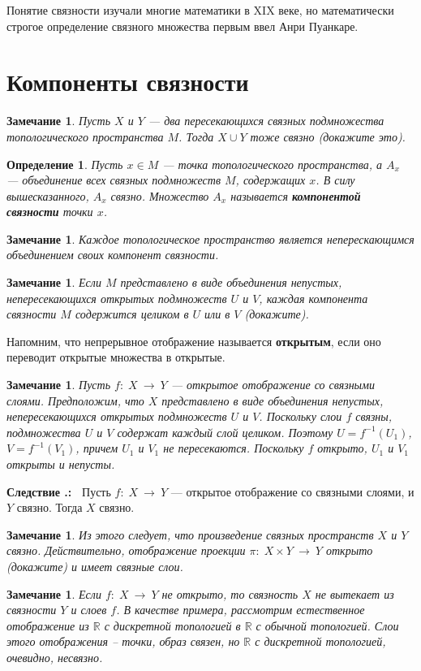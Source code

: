 \documentclass[12pt]{book}
\newcommand{\arrow}{{\:\longrightarrow\:}}
\def\endproof{\hbox{\vrule width 5pt height 5pt depth 0pt}}
\def\R{{\mathbb R}}
\theoremstyle{upshape}
\newtheorem{zadacha}{Задача}[chapter]
\theoremstyle{generic}
\newtheorem{opredelenie}[teorema]{Определение}
\newtheorem{remark}[teorema]{Замечание}
\def\замечание{\begin{remark}}
\def\еза{\end{remark}}
\theoremstyle{upshapenonumber}
\newcommand{\следствие}{%
     \refstepcounter{teorema}
     {\noindent\bf Следствие \thechapter.\arabic{teorema}:\ }}
\newcommand{\пример}{%
     \refstepcounter{teorema}
     {\noindent\bf Пример \thechapter.\arabic{teorema}:\ }}
\newcommand{\лемма}{%
     \refstepcounter{teorema}
     {\noindent\bf Лемма \thechapter.\arabic{teorema}:\ }}
\newcommand{\теорема}{%
     \refstepcounter{teorema}
     {\noindent\bf Теорема \thechapter.\arabic{teorema}:\ }}
\newcommand{\утверждение}{%
     \refstepcounter{teorema}
     {\noindent\bf Утверждение \thechapter.\arabic{teorema}:\ }}
\def\бф{\bf}
\def\ем{\em}
\def\задача{\begin{zadacha}}
\def\ез{\end{zadacha}}
\def\еу{\end{ukazanie}}
\def\определение{\begin{opredelenie}}
\def\ео{\end{opredelenie}}
\def\енум{\begin{enumerate}}
\def\ее{\end{enumerate}}
\begin{document}
\hfill

Понятие связности изучали многие математики в XIX веке, но
математически строгое определение связного множества первым
ввел Анри Пуанкаре.


\section{Компоненты связности}


\замечание
Пусть $X$ и $Y$ --- два пересекающихся связных подмножества
топологического пространства $M$. Тогда $X \cup Y$ тоже связно
(докажите это).
\еза


\определение
Пусть $x\in M$ --- точка топологического пространства,
а $A_x$ --- объединение всех связных подмножеств $M$,
содержащих $x$. В силу вышесказанного, $A_x$ связно.
Множество $A_x$ называется {\бф компонентой связности}
точки $x$.
\ео

\замечание
Каждое топологическое пространство является
неперескающимся объединением своих компонент связности.
\еза


\замечание
Если $M$ представлено в виде объединения
непустых, непересекающихся открытых подмножеств $U$ и $V$,
каждая компонента связности $M$ содержится
целиком в $U$ или в $V$ (докажите).
\еза

Напомним, что непрерывное отображение называется
{\бф открытым}, если оно переводит открытые множества
в открытые.


\замечание
Пусть $f:\; X \arrow Y$ --- открытое отображение
со связными слоями. Предположим, что
$X$ представлено в виде объединения
непустых, непересекающихся открытых подмножеств $U$ и $V$.
Поскольку слои $f$ связны, подмножества $U$ и $V$ содержат каждый
слой целиком. Поэтому $U = f^{-1}(U_1)$, $V = f^{-1}(V_1)$,
причем $U_1$ и $V_1$ не пересекаются.
Поскольку $f$ открыто, $U_1$ и $V_1$ открыты
и непусты. 
\еза

\следствие
Пусть $f:\; X \arrow Y$ --- открытое отображение
со связными слоями, и $Y$ связно. Тогда $X$ связно.
\endproof

\замечание 
Из этого следует, что 
произведение связных пространств $X$ и $Y$ связно.
Действительно, отображение проекции $\pi:\; X\times Y\arrow Y$
открыто (докажите)
и имеет связные слои.
\еза

\замечание
Если  $f:\; X \arrow Y$ не открыто, то связность
$X$ не вытекает из связности $Y$ и слоев $f$.
В качестве примера, рассмотрим естественное
отображение из $\R$ с дискретной топологией в
$\R$ с обычной топологией. Слои этого отображения --
точки, образ связен, но $\R$ с дискретной
топологией, очевидно, несвязно.
\еза
\end{document}
